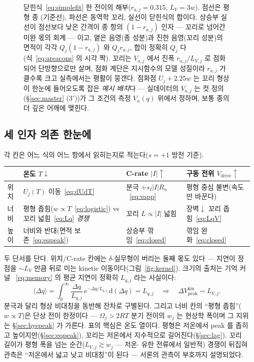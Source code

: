 \documentclass[11pt,a4paper]{article}
\newcommand{\dd}{\mathrm{d}}
\newcommand{\drive}{\mathrm{drive}}
\newcommand{\peak}{\mathrm{peak}}
\begin{document}
\begin{figure}[t]
\caption{닫힌식~\eqref{eq:simplefit} 한 전이의 해부($r_{a,j}=0.315$, $L_V=3w$). 점선은 평형 종
(기준선), 파선은 동역학 꼬리, 실선이 닫힌식의 합이다. 상승부 실선이 점선보다 낮은 간격이 종 항의
$(1-r_{a,j})$ 인자 — 꼬리로 넘어간 미완 몫의 회계 — 이고, 옅은 음영(종 성분)과 진한 음영(꼬리 성분)의
면적이 각각 $Q_j(1-r_{a,j})$ 와 $Q_j r_{a,j}$, 합이 정확히 $Q_j$ 다(식~\eqref{eq:areacons} 의 시각
짝). 꼬리는 $V_{a,j}$ 에서 진폭 $r_{a,j}/L_{V,j}$
로 점화되어 단방향으로만 살며, 점화 계단은 지시함수의 모델 성질이라 $r_{a,j}$ 가 클수록 크고 실측에서는
평활이 뭉갠다. 점화점 $U_j+2.25w$ 는 꼬리 형상이 한눈에 들어오도록 잡은 \emph{예시 배치}다 —
실데이터의 $V_{a,j}$ 는 컷 정의(\S\ref{sec:master} (3$'$))가 그 조건의 측정 $V_n(q)$ 위에서
정하며, 보통 종의 더 깊은 어깨에 맺힌다.}
\label{fig:anatomy}
\end{figure}

\subsection{세 인자 의존 한눈에}
각 칸은 어느 식의 어느 항에서 읽히는지로 적는다($s=+1$ 방전 기준).
\begin{center}
\renewcommand{\arraystretch}{1.4}
\begin{tabular}{p{} p{} p{} p{}}
\toprule
 & \textbf{온도 $T\downarrow$} & \textbf{C-rate $|I|\uparrow$} & \textbf{구동 전위 $V_\drive\uparrow$} \\
\midrule
위치 & $U_j(T)$ 이동~\eqref{eq:dUdT} & 분극 $+s_I|I|R_n$~\eqref{eq:vapp} & 평형 중심 불변(속도만 바꾼다) \\
너비 & 평형 좁힘($w\propto T$~\eqref{eq:logistic}) vs 꼬리 넓힘~\eqref{eq:Lq} \emph{경쟁} & 꼬리 $L\propto|I|$ 넓힘 & 장벽$\downarrow$ 꼬리 좁힘~\eqref{eq:LqV} \\
높이 & 너비와 반대(면적 보존~\eqref{eq:eqpeak}) & 상승부 깎임~\eqref{eq:closed} & 깎임 완화~\eqref{eq:closed} \\
\bottomrule
\end{tabular}
\end{center}
두 단서를 단다. 위치/C-rate 칸에는 $\delta$-실무형이 버리는 둘째 몫도 있다 — 지연이 정점을
$\sim L_V$ 만큼 뒤로 미는 kinetic 이동이다(그림~\ref{fig:kernel}). 크기의 출처는 기억 커널
~\eqref{eq:memory} 의 평균 지연이 정확히 $L_{q,j}$ 라는 사실이다:
\begin{equation}
\langle\Delta q\rangle
=\int_0^\infty\frac{\Delta q}{L_{q,j}}\,e^{-\Delta q/L_{q,j}}\,\dd(\Delta q)
=L_{q,j}
\quad\Rightarrow\quad
\Delta V_{\peak}^{\text{kin}}\sim L_{V,j}.
\label{eq:kinshift}
\end{equation}
분극과 달리 형상 비대칭을 동반해 잔차로 구별된다. 그리고 너비 칸의 ``평형 좁힘''($w\propto T$)은 단상 전이 한정이다 —
$\Omega_j>2RT$ 분기 전이의 $w_j$ 는 현상학 폭이며 그 지위는 \S\ref{sec:hyspeak} 가 가른다.
표의 핵심은 온도 열이다. 평형은 저온에서 peak 를 좁히고 높이지만(\S\ref{sec:eqpeak}), 꼬리는 저온에서
지수적으로 길어진다(\S\ref{sec:lag}). 꼬리 길이가 평형 폭을 넘는 순간($L_{V,j}\gtrsim w_j$ — 저온$\cdot$
유한 전류에서 일반적) 경쟁이 뒤집혀 관측은 ``저온에서 넓고 낮고 비대칭''이 된다 — 서론의 관측이 부호까지
설명되었다.
\end{document}

